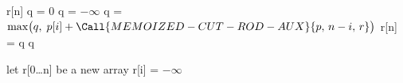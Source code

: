 \begin{algorithmic}
  \State \Return r[n]
\EndIf
{}
  \State q = 0
\Else
  \State q = $-\infty$
    \State q = $\max\bigl(q,\;p[i] + \Call{MEMOIZED-CUT-ROD-AUX}{p,\,n - i,\,r}\bigr)$
  \EndFor
\EndIf
\State r[n] = q
\State \Return q
\EndFunction
\end{algorithmic}

\begin{algorithmic}
\State let r[0\dots n] be a new array
  \State r[i] = $-\infty$
\EndFor
\State \Return {}
\EndFunction
\end{algorithmic}